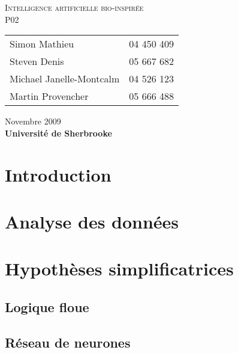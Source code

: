 \documentclass[12pt,letterpaper]{article}
\begin{document}
\renewcommand{\labelitemi}{$\bullet$}
\newcommand{\unit}[1]{\ \mathrm{#1}}
\newcommand{\degree}{\ensuremath{^\circ}}

\thispagestyle{empty}
\begin{center}
	\vspace{20pt}
	\large{\textsc{
		Intelligence artificielle bio-inspirée\\
	}}
	\vspace{20pt}
	\large{\textsc{
		P02
	}}
	\vfill
	\begin{tabular}{ll}
      Simon Mathieu & 04 450 409 \\
      Steven Denis & 05 667 682 \\
	  Michael Janelle-Montcalm & 04 526 123 \\
	  Martin Provencher &	05 666 488 \\
	\end{tabular}
	\vfill
	Novembre 2009 \\
	\textbf{Université de Sherbrooke}
	\vspace{20pt}
\end{center}
\clearpage
\begin{spacing}{0.1}
\tableofcontents
\end{spacing}
\clearpage

\section{Introduction}

\section{Analyse des données}

\section{Hypothèses simplificatrices}

\subsection{Logique floue}

\subsection{Réseau de neurones}
\end{document}
